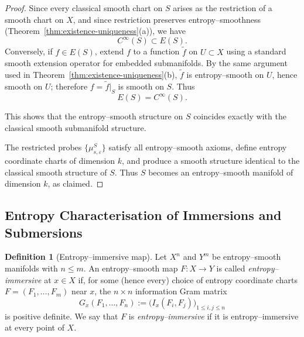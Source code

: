 \documentclass[11pt]{amsart}
\theoremstyle{definition}
\newtheorem{definition}[theorem]{Definition}
\theoremstyle{remark}
\begin{document}
\begin{proof}
Since every classical smooth chart on $S$ arises as the restriction of a 
smooth chart on $X$, and since restriction preserves entropy–smoothness 
(Theorem~\ref{thm:existence-uniqueness}(a)), we have
\[
C^\infty(S) \subset E(S).
\]
Conversely, if $f\in E(S)$, extend $f$ to a function $\tilde f$ on $U\subset X$ 
using a standard smooth extension operator for embedded submanifolds.  
By the same argument used in Theorem~\ref{thm:existence-uniqueness}(b), $\tilde f$ is entropy–smooth on $U$, 
hence smooth on $U$; therefore $f=\tilde f|_S$ is smooth on $S$.  
Thus
\[
E(S)=C^\infty(S).
\]

This shows that the entropy–smooth structure on $S$ coincides exactly with the 
classical smooth submanifold structure.

The restricted probes $\{\mu^{S}_{s,\varepsilon}\}$ satisfy all entropy–smooth 
axioms, define entropy coordinate charts of dimension $k$, and produce a 
smooth structure identical to the classical smooth structure of $S$.  
Thus $S$ becomes an entropy–smooth manifold of dimension $k$, as claimed.
\end{proof}



\subsection{Entropy Characterisation of Immersions and Submersions}

\begin{definition}[Entropy--immersive map]
Let $X^n$ and $Y^m$ be entropy--smooth manifolds with $n\le m$.
An entropy--smooth map $F:X\to Y$ is called \emph{entropy--immersive} at 
$x\in X$ if, for some (hence every) choice of entropy coordinate charts 
$F=(F_1,\dots,F_m)$ near $x$, the $n\times n$ information Gram matrix 
\[
G_x(F_1,\dots,F_n)
:=
\bigl(I_x(F_i,F_j)\bigr)_{1\le i,j\le n}
\]
is positive definite.
We say that $F$ is \emph{entropy--immersive} if it is entropy--immersive
at every point of $X$.
\end{definition}
\end{document}
